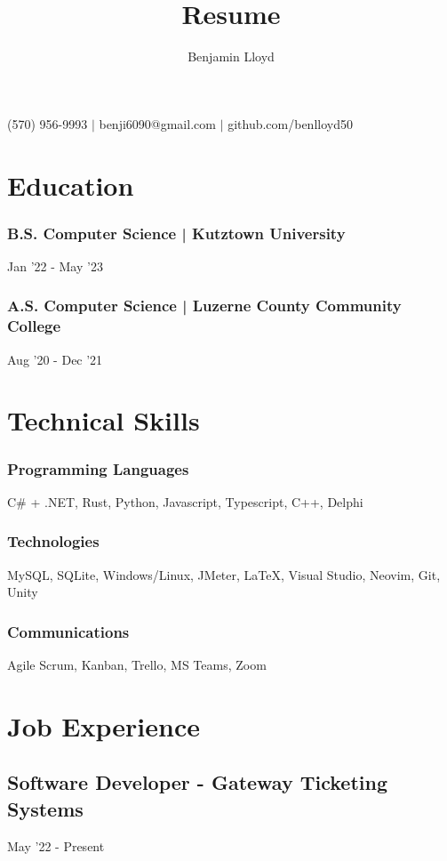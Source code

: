 \documentclass{article}
\makeatletter
\renewcommand{\maketitle}{
\begin{center}
{\huge\bfseries\theauthor}

\vspace{.25em}

(570) 956-9993 $\vert$ benji6090@gmail.com $\vert$ github.com/benlloyd50

\end{center}
}
\makeatother
\begin{document}
\title{Resume}

\author{Benjamin Lloyd}

\maketitle

\section{Education}
\subsubsection{B.S. Computer Science | Kutztown University} \hfill Jan '22 - May '23

\subsubsection{A.S. Computer Science | Luzerne County Community College} \hfill Aug '20 - Dec '21


\section{Technical Skills}

\subsubsection{Programming Languages} C\# + .NET, Rust, Python, Javascript, Typescript, C++, Delphi

\subsubsection{Technologies} MySQL, SQLite, Windows/Linux, JMeter, {\LaTeX}, Visual Studio, Neovim, Git, Unity

\subsubsection{Communications} Agile Scrum, Kanban, Trello, MS Teams, Zoom

\section{Job Experience}
\subsection{Software Developer - Gateway Ticketing Systems} \hfill May '22 - Present
\end{document}
